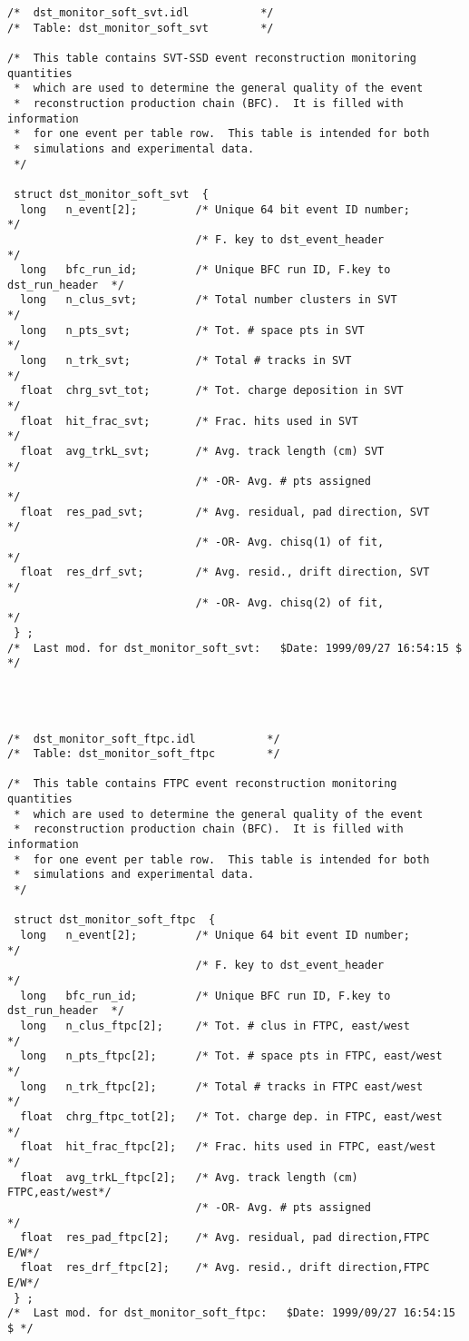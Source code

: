 \begin{verbatim}
/*  dst_monitor_soft_svt.idl           */
/*  Table: dst_monitor_soft_svt        */

/*  This table contains SVT-SSD event reconstruction monitoring quantities
 *  which are used to determine the general quality of the event
 *  reconstruction production chain (BFC).  It is filled with information
 *  for one event per table row.  This table is intended for both
 *  simulations and experimental data.
 */

 struct dst_monitor_soft_svt  {
  long   n_event[2];         /* Unique 64 bit event ID number;       */
                             /* F. key to dst_event_header           */
  long   bfc_run_id;         /* Unique BFC run ID, F.key to dst_run_header  */
  long   n_clus_svt;         /* Total number clusters in SVT         */
  long   n_pts_svt;          /* Tot. # space pts in SVT              */
  long   n_trk_svt;          /* Total # tracks in SVT                */
  float  chrg_svt_tot;       /* Tot. charge deposition in SVT        */
  float  hit_frac_svt;       /* Frac. hits used in SVT               */
  float  avg_trkL_svt;       /* Avg. track length (cm) SVT           */
                             /* -OR- Avg. # pts assigned             */ 
  float  res_pad_svt;        /* Avg. residual, pad direction, SVT    */
                             /* -OR- Avg. chisq(1) of fit,           */
  float  res_drf_svt;        /* Avg. resid., drift direction, SVT    */
                             /* -OR- Avg. chisq(2) of fit,           */
 } ;
/*  Last mod. for dst_monitor_soft_svt:   $Date: 1999/09/27 16:54:15 $ */




/*  dst_monitor_soft_ftpc.idl           */
/*  Table: dst_monitor_soft_ftpc        */

/*  This table contains FTPC event reconstruction monitoring quantities
 *  which are used to determine the general quality of the event
 *  reconstruction production chain (BFC).  It is filled with information
 *  for one event per table row.  This table is intended for both
 *  simulations and experimental data.
 */

 struct dst_monitor_soft_ftpc  {
  long   n_event[2];         /* Unique 64 bit event ID number;       */
                             /* F. key to dst_event_header           */
  long   bfc_run_id;         /* Unique BFC run ID, F.key to dst_run_header  */
  long   n_clus_ftpc[2];     /* Tot. # clus in FTPC, east/west       */
  long   n_pts_ftpc[2];      /* Tot. # space pts in FTPC, east/west  */
  long   n_trk_ftpc[2];      /* Total # tracks in FTPC east/west     */
  float  chrg_ftpc_tot[2];   /* Tot. charge dep. in FTPC, east/west  */
  float  hit_frac_ftpc[2];   /* Frac. hits used in FTPC, east/west   */
  float  avg_trkL_ftpc[2];   /* Avg. track length (cm) FTPC,east/west*/
                             /* -OR- Avg. # pts assigned             */ 
  float  res_pad_ftpc[2];    /* Avg. residual, pad direction,FTPC E/W*/
  float  res_drf_ftpc[2];    /* Avg. resid., drift direction,FTPC E/W*/
 } ;
/*  Last mod. for dst_monitor_soft_ftpc:   $Date: 1999/09/27 16:54:15 $ */





\end{verbatim}
